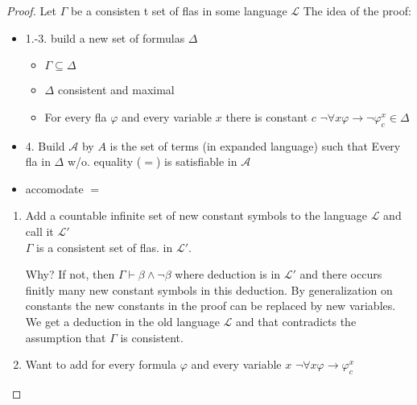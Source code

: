 \begin{proof}
    Let $\Gamma$ be a consisten t set of flas in some language $\mathcal{L}$
    The idea of the proof:
    \begin{itemize}
        \item 1.-3. build a new set of formulas $\Delta$
        \begin{itemize}
            \item $\Gamma \subseteq \Delta$
            \item $\Delta$ consistent and maximal
            \item For every fla $\varphi$ and every variable $x$ there is constant $c$ $\lnot \forall x \varphi\to \lnot \varphi^x_c\in \Delta$
        \end{itemize}
        \item 4. Build $\mathcal{A}$ by $A$ is the set of terms (in expanded language) such that
        Every fla in $\Delta$ w/o. equality ($=$) is satisfiable in $\mathcal{A}$
        \item accomodate $=$
    \end{itemize}
    \begin{enumerate}
        \item Add a countable infinite set of new constant symbols to the language $\mathcal{L}$ and call it $\mathcal{L}'$\\
        $\Gamma$ is a consistent set of flas. in $\mathcal{L}'$.
        \begin{claimproof}
            Why? If not, then $\Gamma\vdash \beta \land \lnot \beta$ where deduction is in $\mathcal{L}'$ 
            and there occurs finitly many new constant symbols in this deduction.
            By generalization on constants the new constants in the proof can be replaced by new variables. We get a 
            deduction in the old language $\mathcal{L}$ and that contradicts the assumption that $\Gamma$ is consistent.
        \end{claimproof}
        \item Want to add for every formula $\varphi$ and every variable $x$ $\lnot \forall x \varphi\to \varphi^x_c$ \\

\end{enumerate}
\end{proof}
